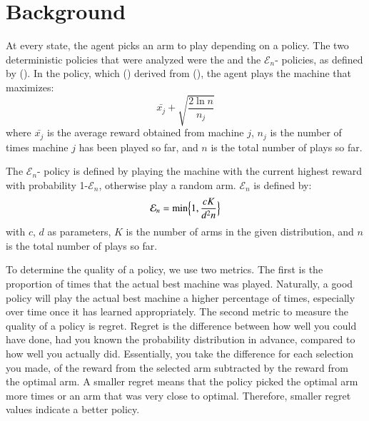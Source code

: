 
\section{Background}
\label{sec:background}

At every state, the agent picks an arm to play depending on a
policy. The two deterministic policies that were analyzed were the
 and the $\mathcal{E}_n$- policies,
as defined by \citeauthor{auer} (\citeyear{auer}). In the 
policy, which \citeauthor{auer} (\citeyear{auer}) derived from
\citeauthor{agrawal} (\citeyear{agrawal}), the agent plays the machine
that maximizes: \begin{equation}\bar{x_j} +
  \sqrt{\frac{2\ln{n}}{n_j}}\end{equation} where $\bar{x_j}$ is the
average reward obtained from machine $j$, $n_j$ is the number of times
machine $j$ has been played so far, and $n$ is the total number of
plays so far. 

The $\mathcal{E}_n$- policy is defined by playing
the machine with the current highest reward with probability
1-$\mathcal{E}_n$, otherwise play a random arm. $\mathcal{E}_n$ is
defined by: \begin{equation}\mathcal{E}_n = \min \Bigl\{ 1,
  \frac{cK}{d^2n} \Bigr\} \end{equation} with $c$, $d$ as parameters, $K$
is the number of arms in the given distribution, and $n$ is the total
number of plays so far.

To determine the quality of a policy, we use two metrics. The first is
the proportion of times that the actual best machine was
played. Naturally, a good policy will play the actual best machine
a higher percentage of times, especially over time once it has learned
appropriately. The second metric to measure the quality of a policy is
regret. Regret is the difference between how well you could have done,
had you known the probability distribution in advance, compared to how
well you actually did. Essentially, you take the difference for each
selection you made, of the reward from the selected arm subtracted by
the reward from the optimal arm. A smaller regret means that the
policy picked the optimal arm more times or an arm that was very close
to optimal. Therefore, smaller regret values indicate a better policy.

 

